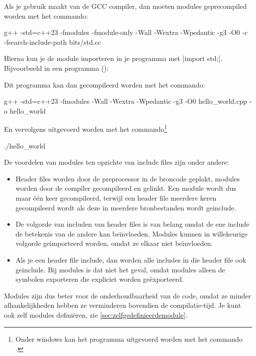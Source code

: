 \begin{cpplstShortInline}
Als je gebruik maakt van de GCC compiler, dan moeten modules geprecompiled worden met het commando:
\begin{lstfragment}
	g++ -std=c++23 -fmodules -fmodule-only -Wall -Wextra -Wpedantic -g3 -O0 -c -fsearch-include-path bits/std.cc
\end{lstfragment}
Hierna kun je de module importeren in je programma met |import std;|.
Bijvoorbeeld in een  programma ():

Dit programma kan dan gecompileerd worden met het commando:
\begin{lstfragment}
	g++ -std=c++23 -fmodules -Wall -Wextra -Wpedantic -g3 -O0 hello_world.cpp -o hello_world
\end{lstfragment}

En vervolgens uitgevoerd worden met het commando\footnote{%
	Onder windows kan het programma uitgevoerd worden met het commando .
}
\begin{lstfragment}
	./hello_world
\end{lstfragment}

De voordelen van modules ten opzichte van include files zijn onder andere:
\begin{itemize}
	\item Header files worden door de preprocessor in de broncode geplakt, modules worden door de compiler gecompileerd en gelinkt. Een module wordt dus maar één keer gecompileerd, terwijl een header file meerdere keren gecompileerd wordt als deze in meerdere bronbestanden wordt geinclude.
	\item De volgorde van includen van header files is van belang omdat de ene include de betekenis van de andere kan beïnvloeden. Modules kunnen in willekeurige volgorde geimporteerd worden, omdat ze elkaar niet beïnvloeden. 
	\item Als je een header file include, dan worden alle includes in die header file ook geinclude. Bij modules is dat niet het geval, omdat modules alleen de symbolen exporteren die expliciet worden geëxporteerd.
\end{itemize}
Modules zijn dus beter voor de onderhoudbaarheid van de code, omdat ze minder afhankelijkheden hebben ze verminderen bovendien de compilatie-tijd.
Je kunt ook zelf modules definiëren, zie \cref{sec:zelfgedefinieerdemodule}.


\end{cpplstShortInline}

